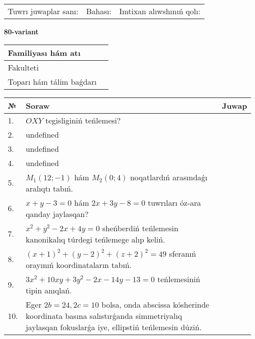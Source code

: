 \documentclass{article}
\begin{document}
\vspace{0.7cm}

\begin{tabular}{lll}
Tuwrı juwaplar sanı: \underline{\hspace{1cm}} & 
Bahası: \underline{\hspace{1cm}} & 
Imtixan alıwshınıń qolı: \underline{\hspace{2cm}} \\
\end{tabular}

\egroup

\newpage


\textbf{80-variant}\\

\bgroup
\def\arraystretch{1.6} %

\begin{tabular}{|m{5.7cm}|m{9.5cm}|}
\hline
Familiyası hám atı & \\
\hline
Fakulteti  & \\
\hline
Toparı hám tálim baǵdarı  & \\
\hline
\end{tabular}

\vspace{0.7cm}

\begin{tabular}{|m{0.7cm}|m{10cm}|m{4cm}|}
\hline
№ & Soraw & Juwap \\
\hline
1. & \(OXY\) tegisliginiń teńlemesi? &  \\
\hline
2. & undefined &  \\
\hline
3. & undefined &  \\
\hline
4. & undefined &  \\
\hline
5. & \(M_{1} (12; - 1)\) hám \(M_{2} (0;4)\) noqatlardıń arasındaǵı aralıqtı tabıń. &  \\
\hline
6. & \(x + y - 3 = 0\) hám \(2 x + 3 y - 8 = 0\) tuwrıları óz-ara qanday jaylasqan? &  \\
\hline
7. & \(x^{2} + y^{2} - 2 x + 4 y = 0\) sheńberdiń teńlemesin kanonikalıq túrdegi teńlemege alıp keliń. &  \\
\hline
8. & \((x + 1) ^{2} + (y - 2) ^{2} + (z + 2) ^{2} = 49\) sferanıń orayınıń koordinataların tabıń. &  \\
\hline
9. & \(3 x^{2} + 10 xy + 3 y^{2} - 2 x - 14 y - 13 = 0\) teńlemesiniń tipin anıqlań. &  \\
\hline
10. & Eger \(2 b = 24, 2 c = 10\) bolsa, onda abscissa kósherinde koordinata basına salıstırǵanda simmetriyalıq jaylasqan fokuslarǵa iye, ellipstiń teńlemesin dúziń. & \\
\hline
\end{tabular}
\end{document}
